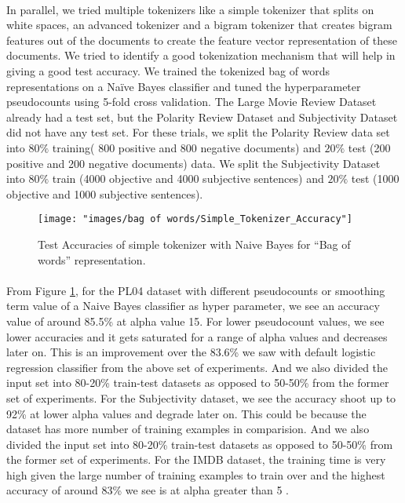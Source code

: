 \documentclass[a4paper,26pt]{article}
\begin{document}
\paragraph{}
In parallel, we tried multiple tokenizers like a simple tokenizer that splits on white spaces, an advanced tokenizer and a bigram tokenizer that creates bigram features out of the documents to create the feature vector representation of these documents. We tried to identify a good tokenization mechanism that will help in giving a good test accuracy. We trained the tokenized bag of words representations on a Naïve Bayes classifier and tuned the hyperparameter pseudocounts using 5-fold cross validation. The Large Movie Review Dataset already had a test set, but the Polarity Review Dataset and Subjectivity Dataset did not have any test set. For these trials, we split the Polarity Review data set into $80\%$ training( 800 positive and 800 negative documents) and $20\%$ test (200 positive and 200 negative documents) data. We split the Subjectivity Dataset into $80\%$ train (4000 objective and 4000 subjective sentences) and $20\%$ test (1000 objective and 1000 subjective sentences).

\begin{figure}[H]
\centerline{\texttt{[image: "images/bag of words/Simple\_Tokenizer\_Accuracy"]}}
\caption{Test Accuracies of simple tokenizer with Naive Bayes for ``Bag of words'' representation.}
\label{fig:simpletok}
\end{figure}

\paragraph{}
From Figure \ref{fig:simpletok}, for the PL04 dataset with different pseudocounts or smoothing term value of a Naive Bayes classifier as  hyper parameter, we see an accuracy value of around 85.5\% at alpha value 15. For lower pseudocount values, we see lower accuracies and it gets saturated for a range of alpha values and decreases later on. This is an improvement over the 83.6\% we saw with default logistic regression classifier from the above set of experiments. And we also divided the input set into 80-20\% train-test datasets as opposed to 50-50\% from the former set of experiments. For the Subjectivity dataset, we see the accuracy shoot up to 92\% at lower alpha values and degrade later on. This could be because the dataset has more number of training examples in comparision. And we also divided the input set into 80-20\% train-test datasets as opposed to 50-50\% from the former set of experiments. For the IMDB dataset, the training time is very high given the large number of training examples to train over and the highest accuracy of around 83\% we see is at alpha greater than 5 . 
\end{document}
